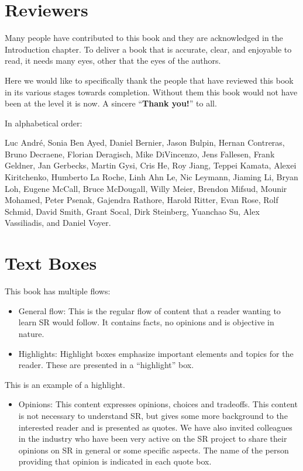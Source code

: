 \section*{Reviewers}

Many people have contributed to this book and they are acknowledged in the Introduction chapter. To deliver a book that is accurate, clear, and enjoyable to read, it needs many eyes, other that the eyes of the authors.

Here we would like to specifically thank the people that have reviewed this book in its various stages towards completion. Without them this book would not have been at the level it is now. A sincere ``\textbf{Thank you!}'' to all.

In alphabetical order:

Luc André, Sonia Ben Ayed, Daniel Bernier, Jason Bulpin, Hernan Contreras, Bruno Decraene, Florian Deragisch, Mike DiVincenzo, Jens Fallesen, Frank Geldner, Jan Gerbecks, Martin Gysi, Cris He, Roy Jiang, Teppei Kamata, Alexei Kiritchenko, Humberto La Roche, Linh Ahn Le, Nic Leymann, Jiaming Li, Bryan Loh, Eugene McCall, Bruce McDougall, Willy Meier, Brendon Mifsud, Mounir Mohamed, Peter Psenak, Gajendra Rathore, Harold Ritter, Evan Rose, Rolf Schmid, David Smith, Grant Socal, Dirk Steinberg, Yuanchao Su, Alex Vassiliadis, and Daniel Voyer.

\pagebreak
\section*{Text Boxes}

This book has multiple flows:

\begin{itemize}
\item
  General flow: This is the regular flow of content that a reader wanting to learn SR would follow. It contains facts, no opinions and is objective in nature.
\item
  Highlights: Highlight boxes emphasize important elements and topics for the reader. These are presented in a ``highlight'' box.
\end{itemize}

\begin{SRHighlight}{}{}

This is an example of a highlight.

\end{SRHighlight}

\begin{itemize}
\tightlist
\item
  Opinions: This content expresses opinions, choices and tradeoffs. This content is not necessary to understand SR, but gives some more background to the interested reader and is presented as quotes. We have also invited colleagues in the industry who have been very active on the SR project to share their opinions on SR in general or some specific aspects. The name of the person providing that opinion is indicated in each quote box.
\end{itemize}

